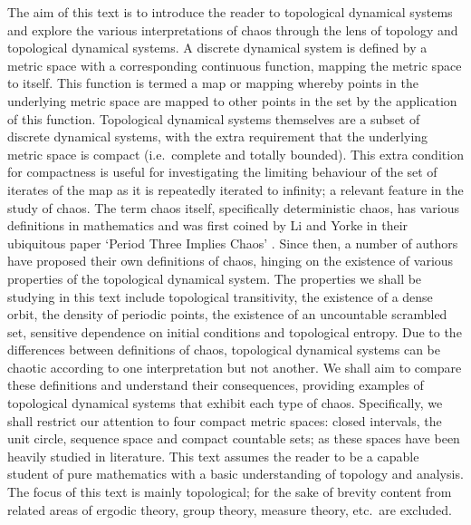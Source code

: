 The aim of this text is to introduce the reader to topological dynamical systems and explore the various interpretations of chaos through the lens of topology and topological dynamical systems. A discrete dynamical system is defined by a metric space with a corresponding continuous function, mapping the metric space to itself. This function is termed a map or mapping whereby points in the underlying metric space are mapped to other points in the set by the application of this function. Topological dynamical systems themselves are a subset of discrete dynamical systems, with the extra requirement that the underlying metric space is compact (i.e.\ complete and totally bounded). This extra condition for compactness is useful for investigating the limiting behaviour of the set of iterates of the map as it is repeatedly iterated to infinity; a relevant feature in the study of chaos. The term chaos itself, specifically deterministic chaos, has various definitions in mathematics and was first coined by Li and Yorke in their ubiquitous paper `Period Three Implies Chaos' \cite{li-yorke}. Since then, a number of authors have proposed their own definitions of chaos, hinging on the existence of various properties of the topological dynamical system. The properties we shall be studying in this text include topological transitivity, the existence of a dense orbit, the density of periodic points, the existence of an uncountable scrambled set, sensitive dependence on initial conditions and topological entropy. Due to the differences between definitions of chaos, topological dynamical systems can be chaotic according to one interpretation but not another. We shall aim to compare these definitions and understand their consequences, providing examples of topological dynamical systems that exhibit each type of chaos. Specifically, we shall restrict our attention to four compact metric spaces: closed intervals, the unit circle, sequence space and compact countable sets; as these spaces have been heavily studied in literature. This text assumes the reader to be a capable student of pure mathematics with a basic understanding of topology and analysis. The focus of this text is mainly topological; for the sake of brevity content from related areas of ergodic theory, group theory, measure theory, etc.\ are excluded.

